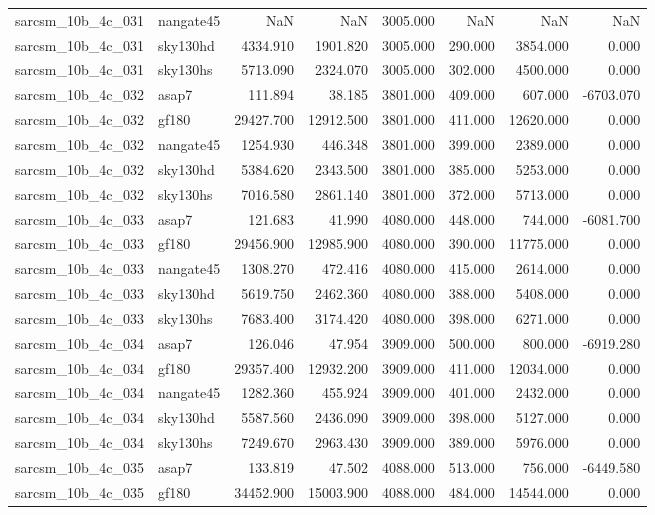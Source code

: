 \begin{tabular}{llrrrrrr}
sarcsm\_10b\_4c\_031 & nangate45 & NaN & NaN & 3005.000 & NaN & NaN & NaN \\
sarcsm\_10b\_4c\_031 & sky130hd & 4334.910 & 1901.820 & 3005.000 & 290.000 & 3854.000 & 0.000 \\
sarcsm\_10b\_4c\_031 & sky130hs & 5713.090 & 2324.070 & 3005.000 & 302.000 & 4500.000 & 0.000 \\
sarcsm\_10b\_4c\_032 & asap7 & 111.894 & 38.185 & 3801.000 & 409.000 & 607.000 & -6703.070 \\
sarcsm\_10b\_4c\_032 & gf180 & 29427.700 & 12912.500 & 3801.000 & 411.000 & 12620.000 & 0.000 \\
sarcsm\_10b\_4c\_032 & nangate45 & 1254.930 & 446.348 & 3801.000 & 399.000 & 2389.000 & 0.000 \\
sarcsm\_10b\_4c\_032 & sky130hd & 5384.620 & 2343.500 & 3801.000 & 385.000 & 5253.000 & 0.000 \\
sarcsm\_10b\_4c\_032 & sky130hs & 7016.580 & 2861.140 & 3801.000 & 372.000 & 5713.000 & 0.000 \\
sarcsm\_10b\_4c\_033 & asap7 & 121.683 & 41.990 & 4080.000 & 448.000 & 744.000 & -6081.700 \\
sarcsm\_10b\_4c\_033 & gf180 & 29456.900 & 12985.900 & 4080.000 & 390.000 & 11775.000 & 0.000 \\
sarcsm\_10b\_4c\_033 & nangate45 & 1308.270 & 472.416 & 4080.000 & 415.000 & 2614.000 & 0.000 \\
sarcsm\_10b\_4c\_033 & sky130hd & 5619.750 & 2462.360 & 4080.000 & 388.000 & 5408.000 & 0.000 \\
sarcsm\_10b\_4c\_033 & sky130hs & 7683.400 & 3174.420 & 4080.000 & 398.000 & 6271.000 & 0.000 \\
sarcsm\_10b\_4c\_034 & asap7 & 126.046 & 47.954 & 3909.000 & 500.000 & 800.000 & -6919.280 \\
sarcsm\_10b\_4c\_034 & gf180 & 29357.400 & 12932.200 & 3909.000 & 411.000 & 12034.000 & 0.000 \\
sarcsm\_10b\_4c\_034 & nangate45 & 1282.360 & 455.924 & 3909.000 & 401.000 & 2432.000 & 0.000 \\
sarcsm\_10b\_4c\_034 & sky130hd & 5587.560 & 2436.090 & 3909.000 & 398.000 & 5127.000 & 0.000 \\
sarcsm\_10b\_4c\_034 & sky130hs & 7249.670 & 2963.430 & 3909.000 & 389.000 & 5976.000 & 0.000 \\
sarcsm\_10b\_4c\_035 & asap7 & 133.819 & 47.502 & 4088.000 & 513.000 & 756.000 & -6449.580 \\
sarcsm\_10b\_4c\_035 & gf180 & 34452.900 & 15003.900 & 4088.000 & 484.000 & 14544.000 & 0.000 \\

\end{tabular}
